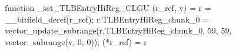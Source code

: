 function _set_TLBEntryHiReg_CLGU (r_ref, v) = {
    r = __bitfield_deref(r_ref);
    r.TLBEntryHiReg_chunk_0 = vector_update_subrange(r.TLBEntryHiReg_chunk_0, 59, 59, vector_subrange(v, 0, 0));
    (*r_ref) = r
}
